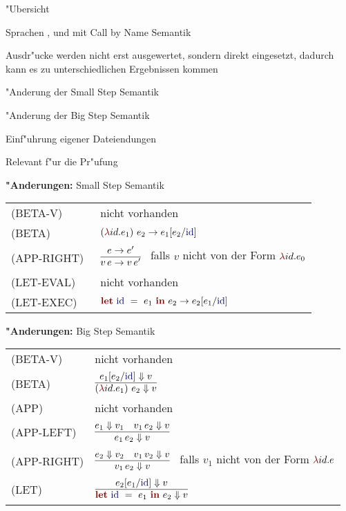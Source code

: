 {
  \begin{itemgroup}{"Ubersicht}
    \item Sprachen \LZEROCBN, \LONECBN und \LTWOCBN  mit Call by Name Semantik
    \item Ausdr"ucke werden nicht erst ausgewertet, sondern direkt eingesetzt,
          dadurch kann es zu unterschiedlichen Ergebnissen kommen
    \item "Anderung der Small Step Semantik
    \item "Anderung der Big Step Semantik
    \item Einf"uhrung eigener Dateiendungen
    \item Relevant f"ur die Pr"ufung \glqq \TPONE \grqq
  \end{itemgroup}
}


{
  {\bf "Anderungen:} Small Step Semantik\\[5mm]
  \begin{tabular}{ll}
     \mbox{(BETA-V)}      & nicht vorhanden \\[3mm]
     \mbox{(BETA)}        & $\ExprApplication{\Parenthesis{\ExprLambda{id}{}{e_1}}}{e_2} \to e_1[e_2/\id]$ \\[3mm]
     \mbox{(APP-RIGHT)\ } & $\regel{e \to e'}
                                   {v\,e \to v\,e'}$ \ 
                                   falls ${v}$ nicht von der Form $\ExprLambda{id}{}{e_0}$ \\[5mm]
     \mbox{(LET-EVAL)\  } & nicht vorhanden \\[3mm]
     \mbox{(LET-EXEC)}    & $\ExprLet{\id}{}{e_1}{e_2} \to e_2[e_1/\id]$ \\[3mm]
  \end{tabular}
}


{
  {\bf "Anderungen:} Big Step Semantik\\[5mm]
  \begin{tabular}{ll}
     \mbox{(BETA-V)}      & nicht vorhanden \\[3mm]
     \mbox{(BETA)}        & $\regel{e_1[e_2/\id] \eval v}
                                   {\ExprApplication{\Parenthesis{\ExprLambda{id}{}{e_1}}}{e_2} \eval v}$ \\[5mm]
     \mbox{(APP)}         & nicht vorhanden \\[3mm]
     \mbox{(APP-LEFT)}    & $\regel{e_1 \eval v_1 \quad v_1\,e_2 \eval v}
                                   {e_1\,e_2 \eval v}$ \\[5mm]
     \mbox{(APP-RIGHT)}   & $\regel{e_2 \eval v_2 \quad v_1\,v_2 \eval v}
                                   {v_1\,e_2 \eval v}$ \ 
                                   falls ${v_1}$ nicht von der Form $\ExprLambda{id}{}{e}$ \\[5mm]
     \mbox{(LET)}         & $\regel{e_2[e_1/\id] \eval v}
                                   {\ExprLet{\id}{}{e_1}{e_2} \eval v}$ \\[5mm]
  \end{tabular}
}


